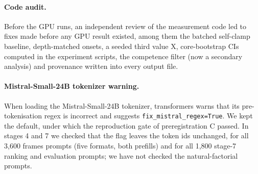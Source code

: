 \paragraph{Code audit.} Before the GPU runs, an independent review of the measurement code led to fixes made before any GPU result existed, among them the batched self-clamp baseline, depth-matched onsets, a seeded third value X, core-bootstrap CIs computed in the experiment scripts, the competence filter (now a secondary analysis) and provenance written into every output file.

\paragraph{Mistral-Small-24B tokenizer warning.} When loading the Mistral-Small-24B tokenizer, transformers warns that its pre-tokenisation regex is incorrect and suggests \texttt{fix\_mistral\_regex=True}. We kept the default, under which the reproduction gate of preregistration C passed. In stages 4 and 7 we checked that the flag leaves the token ids unchanged, for all 3{,}600 frames prompts (five formats, both prefills) and for all 1{,}800 stage-7 ranking and evaluation prompts; we have not checked the natural-factorial prompts.

